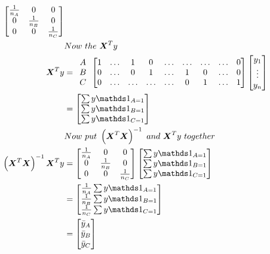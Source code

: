\documentclass[12pt]{article}
\begin{document}
\begin{enumerate}
\begin{align*}
\begin{bmatrix}
        \frac{1}{n_A} & 0 & 0 \\
        0 & \frac{1}{n_B} & 0 \\
        0 & 0 & \frac{1}{n_C}
    \end{bmatrix} \\
    &Now\ the\ \Xt y \\
    \Xt y &=\begin{array}{c c c} 
        A \\
        B \\
        C 
    \end{array}
    \begin{bmatrix}
        1 & \ldots & 1 & 0 & \ldots & \ldots & \ldots & \ldots & 0 \\
        0 & \ldots & 0 & 1 & \ldots & 1 & 0 & \ldots & 0 \\
        0 & \ldots & \ldots & \ldots & \ldots & 0 & 1 & \ldots & 1
    \end{bmatrix} \begin{bmatrix}
        y_1 \\
        \vdots \\
        y_n
    \end{bmatrix} \\
    &= \begin{bmatrix}
        \sum y \indic{A = 1} \\
        \sum y \indic{B = 1} \\
        \sum y \indic{C = 1}
    \end{bmatrix} \\
    &Now\ put\ \XtXinv\ and\ \Xt y\ together\\
    \XtXinvXt y&= 
    \begin{bmatrix}
        \frac{1}{n_A} & 0 & 0 \\
        0 & \frac{1}{n_B} & 0 \\
        0 & 0 & \frac{1}{n_C}
    \end{bmatrix}
    \begin{bmatrix}
        \sum y \indic{A = 1} \\
        \sum y \indic{B = 1} \\
        \sum y \indic{C = 1}
    \end{bmatrix} \\
    &= \begin{bmatrix}
        \frac{1}{n_A} \sum y \indic{A = 1} \\
        \frac{1}{n_B} \sum y \indic{B = 1} \\
        \frac{1}{n_C} \sum y \indic{C = 1}
    \end{bmatrix} \\
    &= \begin{bmatrix}
        \ybar_A \\
        \ybar_B \\
        \ybar_C
    \end{bmatrix}
\end{align*}


\end{enumerate}
\end{document}
